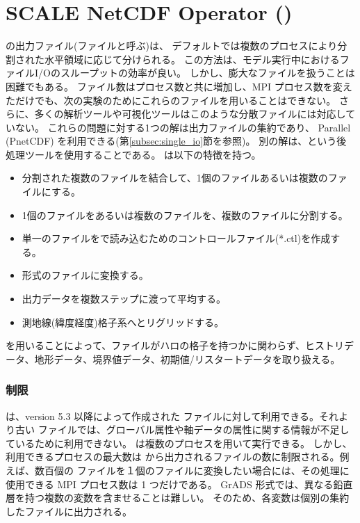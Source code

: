 \section{SCALE NetCDF Operator (\sno)} \label{sec:snoutil}

\scalerm の出力ファイル(\scalenetcdf ファイルと呼ぶ)は、
デフォルトでは複数のプロセスにより分割された水平領域に応じて分けられる。
この方法は、モデル実行中におけるファイルI/Oのスループットの効率が良い。
しかし、膨大なファイルを扱うことは困難でもある。
ファイル数はプロセス数と共に増加し、MPI プロセス数を変えただけでも、次の実験のためにこれらのファイルを用いることはできない。
さらに、多くの解析ツールや可視化ツールはこのような分散ファイルには対応していない。
これらの問題に対する1つの解は出力ファイルの集約であり、
Parallel \netcdf (PnetCDF) を利用できる(第\ref{subsec:single_io}節を参照)。
別の解は、\sno という後処理ツールを使用することである。
\sno は以下の特徴を持つ。

\begin{itemize}
 \item 分割された複数のファイルを結合して、1個のファイルあるいは複数のファイルにする。
 \item 1個のファイルをあるいは複数のファイルを、複数のファイルに分割する。
 \item 単一の{\Netcdf}ファイルを{\grads}で読み込むためのコントロールファイル(*.ctl)を作成する。
 \item \grads 形式のファイルに変換する。
 \item 出力データを複数ステップに渡って平均する。
 \item 測地線(緯度経度)格子系へとリグリッドする。
\end{itemize}

\sno を用いることによって、ファイルがハロの格子を持つかに関わらず、ヒストリデータ、地形データ、境界値データ、初期値/リスタートデータを取り扱える。

\subsubsection{制限}

\sno は、\scalelib version 5.3 以降によって作成された \scalenetcdf ファイルに対して利用できる。それより古い \scalenetcdf ファイルでは、グローバル属性や軸データの属性に関する情報が不足しているために利用できない。
\sno は複数のプロセスを用いて実行できる。
しかし、利用できるプロセスの最大数は \sno から出力されるファイルの数に制限される。例えば、数百個の \scalenetcdf ファイルを１個のファイルに変換したい場合には、その処理に使用できる MPI プロセス数は 1 つだけである。
GrADS 形式では、異なる鉛直層を持つ複数の変数を含ませることは難しい。
そのため、各変数は個別の集約したファイルに出力される。

